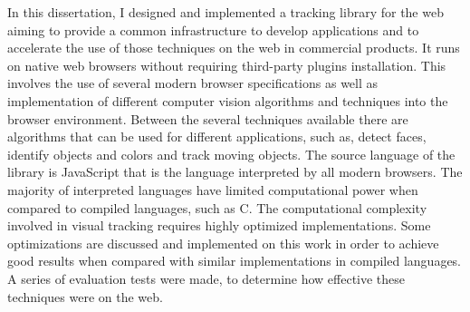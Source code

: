 In this dissertation, I designed and implemented a tracking library for the web aiming to provide a common infrastructure to develop applications and to accelerate the use of those techniques on the web in commercial products. It runs on native web browsers without requiring third-party plugins installation. This involves the use of several modern browser specifications as well as implementation of different computer vision algorithms and techniques into the browser environment. Between the several techniques available there are algorithms that can be used for different applications, such as, detect faces, identify objects and colors and track moving objects. The source language of the library is JavaScript that is the language interpreted by all modern browsers. The majority of interpreted languages have limited computational power when compared to compiled languages, such as C. The computational complexity involved in visual tracking requires highly optimized implementations. Some optimizations are discussed and implemented on this work in order to achieve good results when compared with similar implementations in compiled languages. A series of evaluation tests were made, to determine how effective these techniques were on the web.